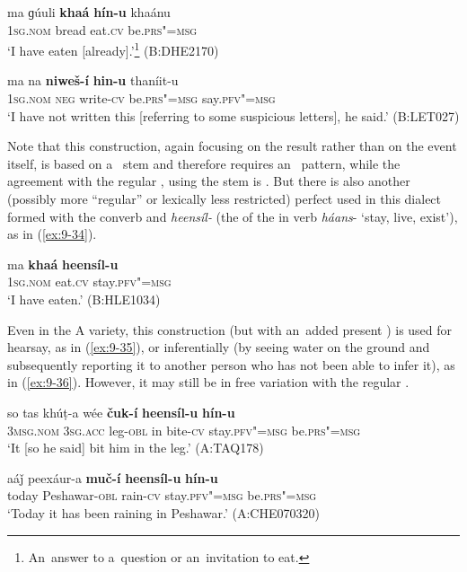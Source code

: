 \begin{exe}
\ex
\label{ex:9-32}
\gll ma ɡúuli \textbf{khaá} \textbf{hín-u} \upshape{(=} khaánu\upshape{)}\\
\textsc{1sg.nom} bread eat.\textsc{cv} be.\textsc{prs"=msg} \\
\glt `I have eaten [already].'\footnote{An~answer to a~question or an~invitation to eat.} (B:DHE2170)

\ex
\label{ex:9-33}
\gll ma na \textbf{niweš-í} \textbf{hin-u} thaníit-u\\
\textsc{1sg.nom} \textsc{neg} write-\textsc{cv} be.\textsc{prs"=msg} say.\textsc{pfv"=msg} \\
\glt `I have not written this [referring to some suspicious letters], he said.' (B:LET027)
\end{exe}

Note that this construction, again focusing on the result rather than on the event itself, is based on a~  stem and therefore requires an~ pattern, while the agreement with the regular , using the   stem is . But there is also another (possibly more ``regular'' or lexically less restricted) perfect used in this dialect formed with the converb and \textit{heensíl-} (the  of the in verb \textit{háans}- `stay, live, exist'), as in (\ref{ex:9-34}).

\begin{exe}
\ex
\label{ex:9-34}
\gll ma \textbf{khaá} \textbf{heensíl-u}  \\
\textsc{1sg.nom} eat.\textsc{cv} stay.\textsc{pfv"=msg} \\
\glt `I have eaten.' (B:HLE1034)
\end{exe}

Even in the A variety, this construction (but with an~added present ) is used for hearsay, as in (\ref{ex:9-35}), or inferentially (by seeing water on the ground and subsequently reporting it to another person who has not been able to infer it), as in (\ref{ex:9-36}). However, it may still be in free variation with the regular .

\begin{exe}
\ex
\label{ex:9-35}
\gll so tas khúṭ-a wée \textbf{čuk-í} \textbf{heensíl-u} \textbf{hín-u} \\
\textsc{3msg.nom} \textsc{3sg.acc} leg-\textsc{obl} in bite-\textsc{cv} stay.\textsc{pfv"=msg} be.\textsc{prs"=msg} \\
\glt `It [so he said] bit him in the leg.' (A:TAQ178)

\ex
\label{ex:9-36}
\gll aáǰ peexáur-a \textbf{muč-í} \textbf{heensíl-u} \textbf{hín-u}  \\
today Peshawar-\textsc{obl} rain-\textsc{cv} stay.\textsc{pfv"=msg} be.\textsc{prs"=msg} \\
\glt `Today it has been raining in Peshawar.' (A:CHE070320)
\end{exe}


